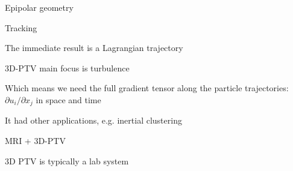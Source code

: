 \documentclass[aspectratio=43]{beamer}
\begin{document}
\begin{frame}{Epipolar geometry}
\begin{multicols}{2}
\end{multicols}
\end{frame}

\begin{frame}{Tracking}
\centering{}
\end{frame}

\begin{frame}{The immediate result is a Lagrangian trajectory}
\begin{multicols}{2}
\centering
{}
\end{multicols}
\end{frame}


%
\begin{frame}{3D-PTV main focus is turbulence}
\begin{cardTiny} 
Which means we need  the \alert{full gradient tensor} along the particle trajectories:
$\partial u_{i}/\partial x_{j}$ in space and time
\end{cardTiny}

\begin{multicols}{2}
\centering
{}
\end{multicols}
\end{frame}

\begin{frame}{It had other applications, e.g. inertial clustering}
\centering{}
\end{frame}

\begin{frame}{MRI + 3D-PTV}
\begin{multicols}{2}
\centering
{}
\end{multicols}
\centering{}
\end{frame}


\begin{frame}{3D PTV is typically a lab system}
\centering{}
\end{frame}
\end{document}
